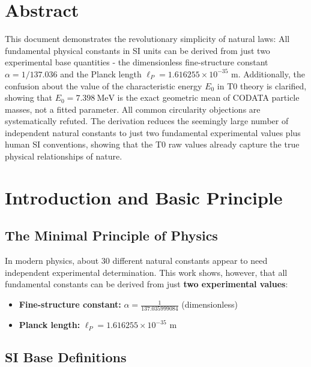 \section*{Abstract}
		This document demonstrates the revolutionary simplicity of natural laws: All fundamental physical constants in SI units can be derived from just two experimental base quantities - the dimensionless fine-structure constant $\alpha = 1/137.036$ and the Planck length $\ell_P = 1.616255 \times 10^{-35}$ m. Additionally, the confusion about the value of the characteristic energy $E_0$ in T0 theory is clarified, showing that $E_0 = \SI{7.398}{\MeV}$ is the exact geometric mean of CODATA particle masses, not a fitted parameter. All common circularity objections are systematically refuted. The derivation reduces the seemingly large number of independent natural constants to just two fundamental experimental values plus human SI conventions, showing that the T0 raw values already capture the true physical relationships of nature.

	

	\section{Introduction and Basic Principle}
	
	\subsection{The Minimal Principle of Physics}
	
	In modern physics, about 30 different natural constants appear to need independent experimental determination. This work shows, however, that all fundamental constants can be derived from just \textbf{two experimental values}:
	
	\begin{tcolorbox}[colback=blue!5!white,colframe=blue!75!black,title=Fundamental Input Data]
		\begin{itemize}
			\item \textbf{Fine-structure constant:} $\alpha = \frac{1}{137.035999084}$ (dimensionless)
			\item \textbf{Planck length:} $\ell_P = 1.616255 \times 10^{-35}$ \si{\meter}
		\end{itemize}
	\end{tcolorbox}
	
	\subsection{SI Base Definitions}
	
